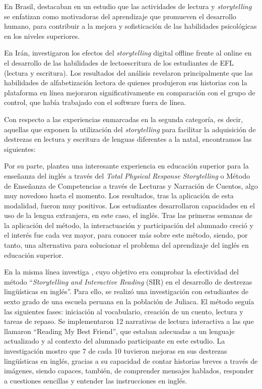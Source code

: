 \documentclass[spanish]{textolivre}
\begin{document}
En Brasil, \textcite{prieto_propostas_2018} destacaban en un estudio que las actividades de lectura y \textit{storytelling} se enfatizan como motivadoras del aprendizaje que promueven el desarrollo humano, para contribuir a la mejora y sofisticación de las habilidades psicológicas en los niveles superiores.

En Irán, \textcite{rahimi_effects_2017} investigaron los efectos del \textit{storytelling} digital offline frente al online en el desarrollo de las habilidades de lectoescritura de los estudiantes de EFL (lectura y escritura). Los resultados del análisis revelaron principalmente que las habilidades de alfabetización lectora de quienes produjeron sus historias con la plataforma en línea mejoraron significativamente en comparación con el grupo de control, que había trabajado con el software fuera de línea.

Con respecto a las experiencias enmarcadas en la segunda categoría, es decir, aquellas que exponen la utilización del \textit{storytelling} para facilitar la adquisición de destrezas en lectura y escritura de lenguas diferentes a la natal, encontramos las siguientes:

Por su parte, \textcite{cedeno_damil_lectura_2019} plantea una interesante experiencia en educación superior para la enseñanza del inglés a través del \textit{Total Physical Response Storytelling} o Método de Enseñanza de Competencias a través de Lecturas y Narración de Cuentos, algo muy novedoso hasta el momento. Los resultados, tras la aplicación de esta modalidad, fueron muy positivos. Los estudiantes desarrollaron capacidades en el uso de la lengua extranjera, en este caso, el inglés. Tras las primeras semanas de la aplicación del método, la interactuación y participación del alumnado creció y el interés fue cada vez mayor, para conocer más sobre este método, siendo, por tanto, una alternativa para solucionar el problema del aprendizaje del inglés en educación superior.

En la misma línea investiga \textcite{arenas_efecto_2018}, cuyo objetivo era comprobar la efectividad del método “\textit{Storytelling and Interactive Reading} (SIR) en el desarrollo de destrezas lingüísticas en inglés”. Para ello, se realizó una investigación con estudiantes de sexto grado de una escuela peruana en la población de Juliaca. El método seguía las siguientes fases: iniciación al vocabulario, creación de un cuento, lectura y tareas de repaso. Se implementaron 12 narrativas de lectura interactiva a las que llamaron “Reading My Best Friend”, que estaban adecuadas a un lenguaje actualizado y al contexto del alumnado participante en este estudio. La investigación mostro que 7 de cada 10 tuvieron mejoras en sus destrezas lingüísticas en inglés, gracias a su capacidad de contar historias breves a través de imágenes, siendo capaces, también, de comprender mensajes hablados, responder a cuestiones sencillas y entender las instrucciones en inglés.
\end{document}
